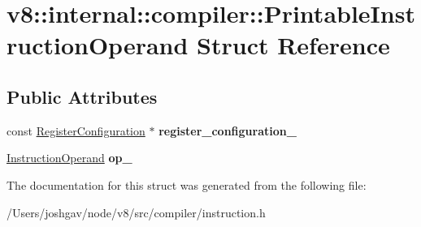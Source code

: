 \hypertarget{structv8_1_1internal_1_1compiler_1_1_printable_instruction_operand}{}\section{v8\+:\+:internal\+:\+:compiler\+:\+:Printable\+Instruction\+Operand Struct Reference}
\label{structv8_1_1internal_1_1compiler_1_1_printable_instruction_operand}
\subsection*{Public Attributes}
\begin{DoxyCompactItemize}
\item 
const \hyperlink{classv8_1_1internal_1_1_register_configuration}{Register\+Configuration} $\ast$ {\bfseries register\+\_\+configuration\+\_\+}\hypertarget{structv8_1_1internal_1_1compiler_1_1_printable_instruction_operand_a36af7cce9b3ddd4cb12e650208d748af}{}\label{structv8_1_1internal_1_1compiler_1_1_printable_instruction_operand_a36af7cce9b3ddd4cb12e650208d748af}

\item 
\hyperlink{classv8_1_1internal_1_1compiler_1_1_instruction_operand}{Instruction\+Operand} {\bfseries op\+\_\+}\hypertarget{structv8_1_1internal_1_1compiler_1_1_printable_instruction_operand_ad38676adddf38cfce041e0577ce2eddc}{}\label{structv8_1_1internal_1_1compiler_1_1_printable_instruction_operand_ad38676adddf38cfce041e0577ce2eddc}

\end{DoxyCompactItemize}


The documentation for this struct was generated from the following file\+:\begin{DoxyCompactItemize}
\item 
/\+Users/joshgav/node/v8/src/compiler/instruction.\+h\end{DoxyCompactItemize}
